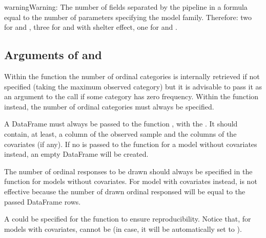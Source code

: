 \documentclass[letterpaper,10pt,english]{sphinxmanual}
\begin{document}
\begin{sphinxadmonition}{warning}{Warning:}
\sphinxAtStartPar
The number of fields separated by the pipeline \sphinxcode{\sphinxupquote{|}} in a formula  equal to
the number of parameters specifying the model family. Therefore: two for  and ,
three for  and  with shelter effect, one for  and .
\end{sphinxadmonition}


\subsection{Arguments of  and }
\label{\detokenize{manual:arguments-of-estimate-and-draw}}
\sphinxAtStartPar
Within the function  the number of ordinal categories  is internally retrieved if not specified
(taking the maximum observed category)
but it is advisable to pass it as an argument to the call if some category has zero frequency.
Within the function  instead, the number of ordinal categories  must always be specified.

\sphinxAtStartPar
A  DataFrame must always be passed to the function , with the  .
It should contain, at least, a column of the observed sample and the columns of the covariates (if any).
If no  is passed to the function  for a model without covariates
instead, an empty DataFrame will be created.

\sphinxAtStartPar
The number  of ordinal responses to be drawn should always be specified in the function 
for models without covariates. For model with covariates instead,  is not effective because
the number of drawn ordinal responsed will be equal to the passed DataFrame rows.

\sphinxAtStartPar
A  could be specified for the function  to ensure reproducibility.
Notice that, for models with covariates,  cannot be  (in case, it will be
automatically set to ).
\end{document}
